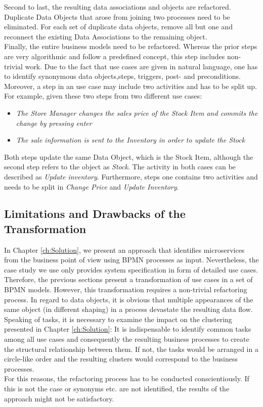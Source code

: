 Second to last, the resulting data associations and objects are refactored. Duplicate Data Objects that arose from joining two processes need to be eliminated. For each set of duplicate data objects, remove all but one and reconnect the existing Data Associations to the remaining object. \\
Finally, the entire business models need to be refactored. Whereas the prior steps are very algorithmic and follow a predefined concept, this step includes non-trivial work. Due to the fact that use cases are given in natural language, one has to identify synonymous data objects,steps, triggers, post- and preconditions. Moreover, a step in an use case may include two activities and has to be split up.
For example, given these two steps from two different use cases:
\begin{itemize}
	\item \textit{The Store Manager changes the sales price of the Stock Item and commits the change by pressing enter}
	\item \textit{The sale information is sent to the Inventory in order to update the Stock}
\end{itemize}
Both steps update the same Data Object, which is the Stock Item, although the second step refers to the object as \textit{Stock}. The activity in both cases can be described as \textit{Update inventory}. Furthermore, steps one contains two activities and needs to be split in \textit{Change Price} and \textit{Update Inventory}.

\subsection{Limitations and Drawbacks of the Transformation}
In Chapter \ref{ch:Solution}, we present an approach that identifies microservices from the business point of view using BPMN processes as input. Nevertheless, the case study we use only provides system specification in form of detailed use cases. Therefore, the previous sections present a transformation of use cases in a set of BPMN models. However, this transformation requires a non-trivial refactoring process. In regard to data objects, it is obvious that multiple appearances of the same object (in different shaping) in a process devastate the resulting data flow. Speaking of tasks, it is necessary to examine the impact on the clustering presented in Chapter \ref{ch:Solution}: It is indispensable to identify common tasks among all use cases and consequently the resulting business processes to create the structural relationship between them. If not, the tasks would be arranged in a circle-like order and the resulting clusters would correspond to the business processes. \\
For this reasons, the refactoring process has to be conducted 
conscientiously. If this is not the case or synonyms etc. are not identified, the results of the approach might not be satisfactory.


